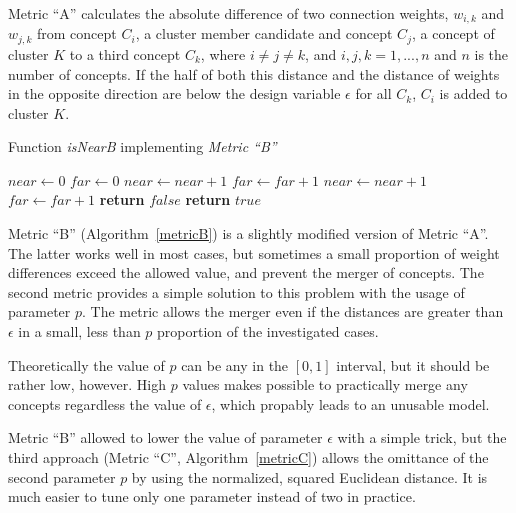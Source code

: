 \documentclass[graybox]{svmult}
\begin{document}
Metric ``A'' calculates the absolute difference of two connection weights, $w_{i,k}$ and $w_{j,k}$ from concept $C_i$, a cluster member candidate and concept $C_j$, a concept of cluster $K$ to a third concept $C_k$, where $i \ne j \ne k$, and $i, j, k = 1, ..., n$ and $n$ is the number of concepts. If the half of both this distance and the distance of weights in the opposite direction are below the design variable $\epsilon$ for all $C_k$, $C_i$ is added to cluster $K$.

\begin{algorithm}
  \caption{Function \emph{isNearB} implementing \emph{Metric ``B''}}\label{metricB}
  \begin{algorithmic}[1]
      \State $near \gets 0$
      \State $far \gets 0$
            \State $near \gets near + 1$
          \Else
            \State $far \gets far + 1$
          \EndIf
            \State $near \gets near + 1$
          \Else
            \State $far \gets far + 1$
          \EndIf
        \EndIf
      \EndFor
        \State \textbf{return} $false$
      \Else
        \State \textbf{return} $true$
      \EndIf
    \EndFunction
  \end{algorithmic}
\end{algorithm}

Metric ``B'' (Algorithm~\ref{metricB}) is a slightly modified version of Metric ``A''. The latter works well in most cases, but sometimes a small proportion of weight differences exceed the allowed value, and prevent the merger of concepts. The second metric provides a simple solution to this problem with the usage of parameter $p$. The metric allows the merger even if the distances are greater than $\epsilon$ in a small, less than $p$ proportion of the investigated cases.

Theoretically the value of $p$ can be any in the $[0, 1]$ interval, but it should be rather low, however. High $p$ values makes possible to practically merge any concepts regardless the value of $\epsilon$, which propably leads to an unusable model.

Metric ``B'' allowed to lower the value of parameter $\epsilon$ with a simple trick, but the third approach (Metric ``C'', Algorithm~\ref{metricC}) allows the omittance of the second parameter $p$ by using the normalized, squared Euclidean distance. It is much easier to tune only one parameter instead of two in practice.
\end{document}
